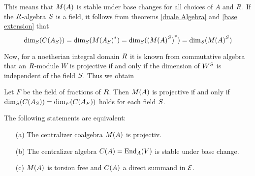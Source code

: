 \documentclass[twoside,12pt]{article}
\begin{document}
This means that $M(A)$ is stable under base changes for all choices of $A$ and $R$.
If the $R$-algebra $S$ is a field, it follows from theorems
\ref{duale Algebra} and \ref{base extension} that
\begin{equation} \label{Dim CA MA}
{\rm dim}_{S}{(C({A}_{S}))}=
{\rm dim}_{S}{({M({A}_{S})}^*)}=
{\rm dim}_{S}{({({M(A)}^{S})}^*)}={\rm dim}_{S}{({M(A)}^{S})}
\end{equation}

Now, for a noetherian integral domain $R$ 
it is known from commutative algebra that an $R$-module $W$ is
projective if and only if the dimension of ${W}^{S}$ is independent
of the field $S$. Thus we obtain


\begin{cor} \label{MA lokal frei} 
Let $F$ be the field of fractions of $R$. Then
$M(A)$ is projective if and only if
${\rm dim}_{S}{(C({A}_{S}))}={\rm dim}_{F}{(C({A}_{F}))}$ holds for each field
$S$.
\end{cor}



\begin{thm} \label{starkes Kriterium}
The following statements are equivalent:
\begin{itemize}
\item[(a)] The centralizer coalgebra $M(A)$ is projectiv.
\item[(b)] The centralizer algebra $C(A)={\rm End}_{A}{(V)}$ is stable under base change.
\item[(c)] $M(A)$ is torsion free and $C(A)$ a direct summand in ${\cal E}$. 
\end{itemize}
\end{thm}
\end{document}
